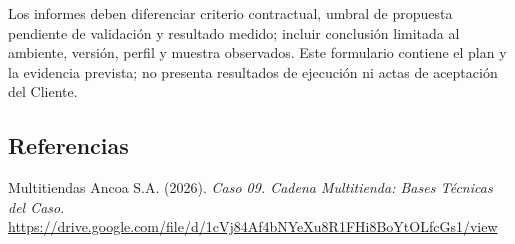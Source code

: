 \documentclass[11pt]{article}
\begin{document}
Los informes deben diferenciar criterio contractual, umbral de propuesta pendiente de validación y resultado medido; incluir conclusión limitada al ambiente, versión, perfil y muestra observados. Este formulario contiene el plan y la evidencia prevista; no presenta resultados de ejecución ni actas de aceptación del Cliente.

\subsection{Referencias}\label{t13-referencias}

Multitiendas Ancoa S.A. (2026). \emph{Caso 09. Cadena Multitienda: Bases Técnicas del Caso}. \url{https://drive.google.com/file/d/1cVj84Af4bNYeXu8R1FHi8BoYtOLfcGs1/view}

\ossFinalPage
\end{document}
